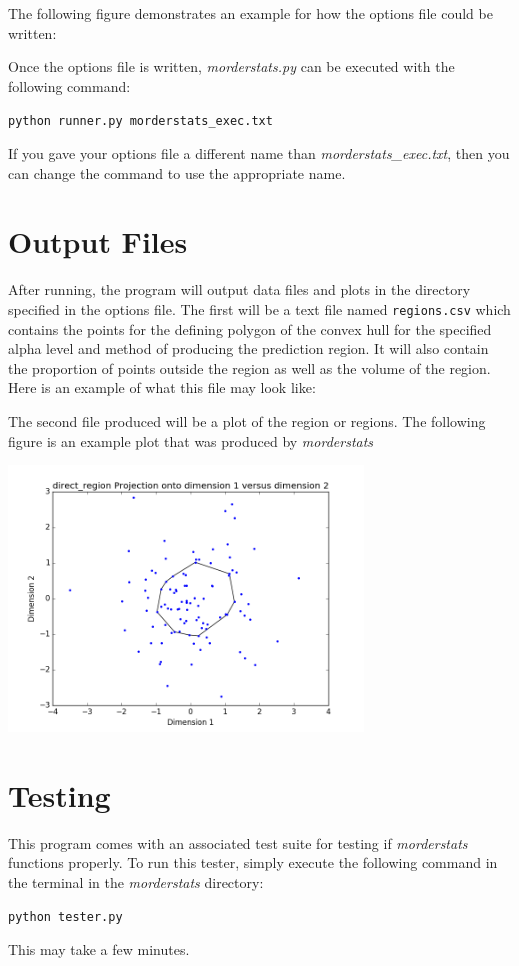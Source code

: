 \documentclass[11pt]{article}
\begin{document}
The following figure demonstrates an example for how the options file could be written:

\begin{framed}
	
\end{framed}

Once the options file is written, \textit{morderstats.py} can be executed with the following command:
\begin{center}
	\texttt{python runner.py morderstats\_exec.txt}
\end{center}

If you gave your options file a different name than \textit{morderstats\_exec.txt}, then you can change the command to use the appropriate name.

\section{Output Files}
After running, the program will output data files and plots in the directory specified in the options file. The first will be a text file named \texttt{regions.csv} which contains the points for the defining polygon of the convex hull for the specified alpha level and method of producing the prediction region. It will also contain the proportion of points outside the region as well as the volume of the region. Here is an example of what this file may look like:

\begin{framed}
	
\end{framed}

The second file produced will be a plot of the region or regions.
The following figure is an example plot that was produced by \textit{morderstats}

\begin{center}
\includegraphics[height=200pt]{direct_region1vs2.png}
\end{center}

\section{Testing}
This program comes with an associated test suite for testing if \textit{morderstats} functions properly.
To run this tester, simply execute the following command in the terminal in the \textit{morderstats} directory:
\begin{center}
	\texttt{python tester.py}
\end{center}

This may take a few minutes.
\end{document}
